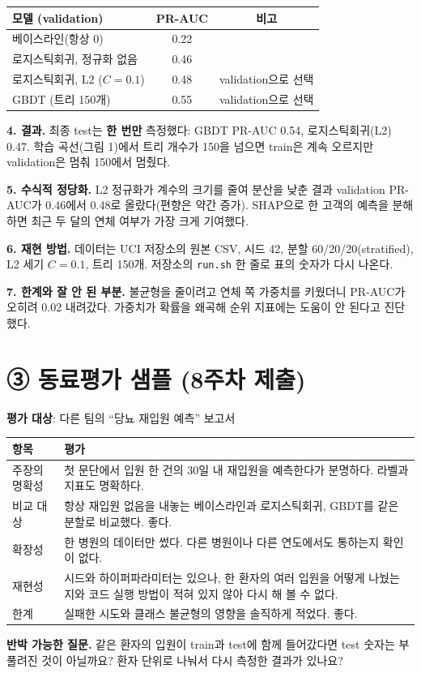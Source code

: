 \documentclass[11pt]{article}
\begin{document}
\begin{center}\small
\begin{tabular}{@{}lcc@{}}\toprule
모델 (validation) & PR-AUC & 비고 \\\midrule
베이스라인(항상 0) & 0.22 & \\
로지스틱회귀, 정규화 없음 & 0.46 & \\
로지스틱회귀, L2 ($C=0.1$) & 0.48 & validation으로 선택 \\
GBDT (트리 150개) & 0.55 & validation으로 선택 \\\bottomrule
\end{tabular}
\end{center}

\noindent\textbf{4. 결과.} 최종 test는 \textbf{한 번만} 측정했다: GBDT PR-AUC 0.54, 로지스틱회귀(L2) 0.47. 학습 곡선(그림 1)에서 트리 개수가 150을 넘으면 train은 계속 오르지만 validation은 멈춰 150에서 멈췄다.

\noindent\textbf{5. 수식적 정당화.} L2 정규화가 계수의 크기를 줄여 분산을 낮춘 결과 validation PR-AUC가 0.46에서 0.48로 올랐다(편향은 약간 증가). SHAP으로 한 고객의 예측을 분해하면 최근 두 달의 연체 여부가 가장 크게 기여했다.

\noindent\textbf{6. 재현 방법.} 데이터는 UCI 저장소의 원본 CSV, 시드 42, 분할 60/20/20(stratified), L2 세기 $C=0.1$, 트리 150개. 저장소의 \texttt{run.sh} 한 줄로 표의 숫자가 다시 나온다.

\noindent\textbf{7. 한계와 잘 안 된 부분.} 불균형을 줄이려고 연체 쪽 가중치를 키웠더니 PR-AUC가 오히려 0.02 내려갔다. 가중치가 확률을 왜곡해 순위 지표에는 도움이 안 된다고 진단했다.

\newpage
\section*{③ 동료평가 샘플 (8주차 제출)}
\noindent\textbf{평가 대상}: 다른 팀의 ``당뇨 재입원 예측'' 보고서

\begin{center}\small
\begin{tabular}{@{}p{3.4cm}p{9cm}@{}}\toprule
항목 & 평가 \\\midrule
주장의 명확성 & 첫 문단에서 입원 한 건의 30일 내 재입원을 예측한다가 분명하다. 라벨과 지표도 명확하다. \\
비교 대상 & 항상 재입원 없음을 내놓는 베이스라인과 로지스틱회귀, GBDT를 같은 분할로 비교했다. 좋다. \\
확장성 & 한 병원의 데이터만 썼다. 다른 병원이나 다른 연도에서도 통하는지 확인이 없다. \\
재현성 & 시드와 하이퍼파라미터는 있으나, 한 환자의 여러 입원을 어떻게 나눴는지와 코드 실행 방법이 적혀 있지 않아 다시 해 볼 수 없다. \\
한계 & 실패한 시도와 클래스 불균형의 영향을 솔직하게 적었다. 좋다. \\
\bottomrule\end{tabular}\end{center}

\noindent\textbf{반박 가능한 질문.} 같은 환자의 입원이 train과 test에 함께 들어갔다면 test 숫자는 부풀려진 것이 아닐까요? 환자 단위로 나눠서 다시 측정한 결과가 있나요?
\end{document}
